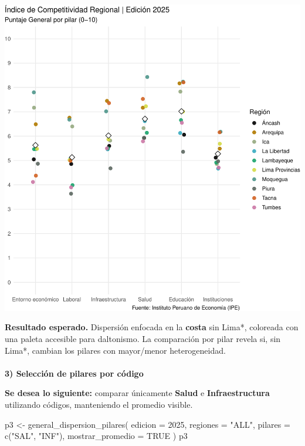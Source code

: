 \documentclass[
  11pt,
  letterpaper,
  DIV=11,
  numbers=noendperiod]{scrartcl}
\makeatletter
\let\oldparagraph\paragraph
\renewcommand{\paragraph}{
    \@ifstar
      \xxxParagraphStar
      \xxxParagraphNoStar
  }
\newcommand{\xxxParagraphStar}[1]{\oldparagraph*{#1}\mbox{}}
\newcommand{\xxxParagraphNoStar}[1]{\oldparagraph{#1}\mbox{}}
\newenvironment{Shaded}{\begin{snugshade}}{\end{snugshade}}
\newcommand{\AttributeTok}[1]{\textcolor[rgb]{0.40,0.45,0.13}{#1}}
\newcommand{\ConstantTok}[1]{\textcolor[rgb]{0.56,0.35,0.01}{#1}}
\newcommand{\DecValTok}[1]{\textcolor[rgb]{0.68,0.00,0.00}{#1}}
\newcommand{\FunctionTok}[1]{\textcolor[rgb]{0.28,0.35,0.67}{#1}}
\newcommand{\NormalTok}[1]{\textcolor[rgb]{0.00,0.23,0.31}{#1}}
\newcommand{\OtherTok}[1]{\textcolor[rgb]{0.00,0.23,0.31}{#1}}
\newcommand{\StringTok}[1]{\textcolor[rgb]{0.13,0.47,0.30}{#1}}
\makeatother
\begin{document}
\includegraphics{Manual_files/figure-pdf/unnamed-chunk-22-1.pdf}

\textbf{Resultado esperado.} Dispersión enfocada en la \textbf{costa}
sin Lima*, coloreada con una paleta accesible para daltonismo. La
comparación por pilar revela si, sin Lima*, cambian los pilares con
mayor/menor heterogeneidad.

\paragraph{\texorpdfstring{\textbf{3) Selección de pilares por
código}}{3) Selección de pilares por código}}\label{selecciuxf3n-de-pilares-por-cuxf3digo}

\textbf{Se desea lo siguiente:} comparar únicamente \textbf{Salud} e
\textbf{Infraestructura} utilizando códigos, manteniendo el promedio
visible.

\begin{Shaded}
\begin{Highlighting}[]
\NormalTok{p3 }\OtherTok{\textless{}{-}} \FunctionTok{general\_dispersion\_pilares}\NormalTok{(}
  \AttributeTok{edicion =} \DecValTok{2025}\NormalTok{,}
  \AttributeTok{regiones =} \StringTok{"ALL"}\NormalTok{,}
  \AttributeTok{pilares  =} \FunctionTok{c}\NormalTok{(}\StringTok{"SAL"}\NormalTok{, }\StringTok{"INF"}\NormalTok{),}
  \AttributeTok{mostrar\_promedio =} \ConstantTok{TRUE}
\NormalTok{)}
\NormalTok{p3}
\end{Highlighting}
\end{Shaded}
\end{document}
